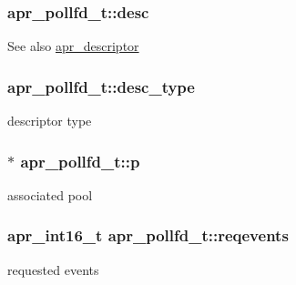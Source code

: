 \subsubsection[{\texorpdfstring{desc}{desc}}]{ apr\+\_\+pollfd\+\_\+t\+::desc}\hypertarget{structapr__pollfd__t_ad63baa71bb91f80513d33482e28fb967}{}\label{structapr__pollfd__t_ad63baa71bb91f80513d33482e28fb967}
\begin{DoxySeeAlso}{See also}
\hyperlink{unionapr__descriptor}{apr\+\_\+descriptor} 
\end{DoxySeeAlso}
\subsubsection[{\texorpdfstring{desc\+\_\+type}{desc_type}}]{ apr\+\_\+pollfd\+\_\+t\+::desc\+\_\+type}\hypertarget{structapr__pollfd__t_acfafd260241a874745f49ba2df246c53}{}\label{structapr__pollfd__t_acfafd260241a874745f49ba2df246c53}
descriptor type 
\subsubsection[{\texorpdfstring{p}{p}}]{$\ast$ apr\+\_\+pollfd\+\_\+t\+::p}\hypertarget{structapr__pollfd__t_adae68586ed671472590efe8770de38cc}{}\label{structapr__pollfd__t_adae68586ed671472590efe8770de38cc}
associated pool 
\subsubsection[{\texorpdfstring{reqevents}{reqevents}}]{\setlength{\rightskip}{0pt plus 5cm}apr\+\_\+int16\+\_\+t apr\+\_\+pollfd\+\_\+t\+::reqevents}\hypertarget{structapr__pollfd__t_abcedac7097a97823a38ece6e47f4ea9f}{}\label{structapr__pollfd__t_abcedac7097a97823a38ece6e47f4ea9f}
requested events 
